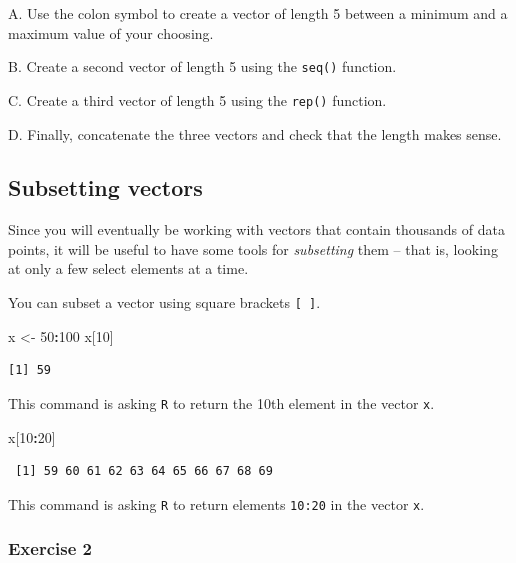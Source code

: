 \documentclass[
]{book}
\newenvironment{Shaded}{\begin{snugshade}}{\end{snugshade}}
\newcommand{\DecValTok}[1]{\textcolor[rgb]{0.00,0.00,0.81}{#1}}
\newcommand{\NormalTok}[1]{#1}
\newcommand{\OperatorTok}[1]{\textcolor[rgb]{0.81,0.36,0.00}{\textbf{#1}}}
\newcommand{\StringTok}[1]{\textcolor[rgb]{0.31,0.60,0.02}{#1}}
\begin{document}
A. Use the colon symbol to create a vector of length 5 between a minimum and a maximum value of your choosing.

B. Create a second vector of length 5 using the \texttt{seq()} function.

C. Create a third vector of length 5 using the \texttt{rep()} function.

D. Finally, concatenate the three vectors and check that the length makes sense.

\hypertarget{subsetting-vectors}{%
\subsection*{Subsetting vectors}\label{subsetting-vectors}}

Since you will eventually be working with vectors that contain thousands of data points, it will be useful to have some tools for \emph{subsetting} them -- that is, looking at only a few select elements at a time.

You can subset a vector using square brackets \texttt{{[}\ {]}}.

\begin{Shaded}
\begin{Highlighting}[]
\NormalTok{x <-}\StringTok{ }\DecValTok{50}\OperatorTok{:}\DecValTok{100}
\NormalTok{x[}\DecValTok{10}\NormalTok{]}
\end{Highlighting}
\end{Shaded}

\begin{verbatim}
[1] 59
\end{verbatim}

This command is asking \texttt{R} to return the 10th element in the vector \texttt{x}.

\begin{Shaded}
\begin{Highlighting}[]
\NormalTok{x[}\DecValTok{10}\OperatorTok{:}\DecValTok{20}\NormalTok{]}
\end{Highlighting}
\end{Shaded}

\begin{verbatim}
 [1] 59 60 61 62 63 64 65 66 67 68 69
\end{verbatim}

This command is asking \texttt{R} to return elements \texttt{10:20} in the vector \texttt{x}.

\hypertarget{exercise-2-2}{%
\subsubsection*{Exercise 2}\label{exercise-2-2}}
\end{document}
